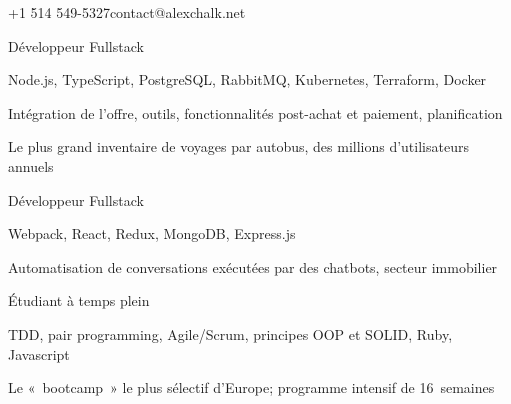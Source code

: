 \documentclass{edelgas-resume}
\begin{document}
\namehead%
\githubhead%
\address{7-6575 Rue Saint-Urbain, Montréal (QC) H2S 3G6, Canada}{+1 514 549-5327}{contact@alexchalk.net}


\vspace{-1.8em}
{\fontsize{10}{15}}
\vspace{1em}



\begin{position}{Développeur Fullstack}{}
	\item Node.js, TypeScript, PostgreSQL, RabbitMQ, Kubernetes, Terraform, Docker
  \item Intégration de l'offre, outils, fonctionnalités post-achat et paiement, planification
  \item Le plus grand inventaire de voyages par autobus, des millions d'utilisateurs annuels

\end{position}

\begin{position}{Développeur Fullstack}{}
\item Webpack, React, Redux, MongoDB, Express.js
\item Automatisation de conversations exécutées par des chatbots, secteur immobilier

\end{position}


\begin{position}{Étudiant à temps plein}{}
\item TDD, pair programming, Agile/Scrum, principes OOP et SOLID, Ruby, Javascript
\item Le « bootcamp » le plus sélectif d'Europe; programme intensif de 16 semaines

\end{position}
\end{document}
